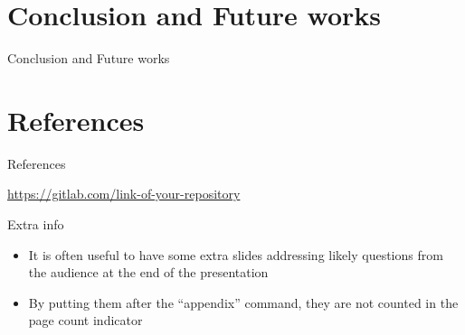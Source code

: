 \documentclass[
  xcolor={hyperref,svgnames,x11names,table},
  hyperref={pdfencoding=unicode,plainpages=false,pdfpagelabels=true,breaklinks=true},
  brazilian,english,12pt,aspectratio=149,
]{beamer}
\begin{document}
\section{Conclusion and Future works}

\begin{frame}{Conclusion and Future works}
\end{frame}

\section{References}

\begin{frame}[allowframebreaks]{References}
  \nocite{dbevolution, shannon, FSF, natbib, biblatex,
          eco:09, alon09:how, curie, gridpat}
  \printbibliography
\end{frame}

\begin{frame}[t]{\insertshorttitle}
  \overview

  \vspace{1\baselineskip}
  \bgroup
  \centering
    \url{https://gitlab.com/link-of-your-repository}\par
  \egroup

\end{frame}

\showqrcode

\appendix %

\begin{frame}{Extra info}
  \begin{itemize}
    \item It is often useful to have some extra slides addressing likely questions from the audience at the end of the presentation
    \item By putting them after the ``appendix'' command, they are not counted in the page count indicator
  \end{itemize}
\end{frame}
\end{document}
